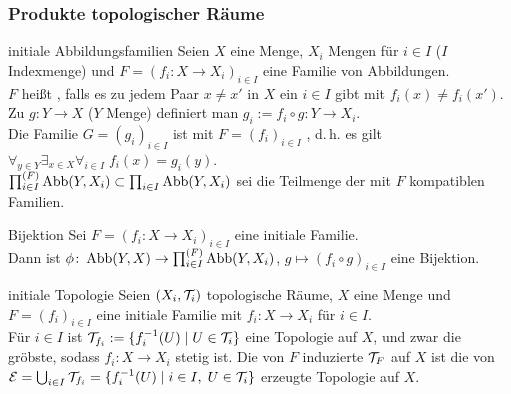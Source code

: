 \subsubsection{%
    Produkte topologischer Räume%
}

\begin{Def}{initiale Abbildungsfamilien}
    Seien $X$ eine Menge, $X_i$ Mengen für $i \in I$ ($I$ Indexmenge)
    und $F = (f_i\colon X \rightarrow X_i)_{i \in I}$ eine Familie von
    Abbildungen. \\
    $F$ heißt , falls es
    zu jedem Paar $x \not= x'$ in $X$ ein $i \in I$ gibt mit
    $f_i(x) \not= f_i(x')$. \\
    Zu $g\colon Y \rightarrow X$ ($Y$ Menge) definiert man
    $g_i := f_i \circ g\colon Y \rightarrow X_i$. \\
    Die Familie $G = (g_i)_{i \in I}$ ist mit $F = (f_i)_{i \in I}$
    , d.\,h. es gilt
    $\forall_{y \in Y} \exists_{x \in X} \forall_{i \in I}\;
    f_i(x) = g_i(y)$. \\
    $\prod_{i \in I}^{(F)} \operatorname{Abb}(Y, X_i) \subset \prod_{i \in I} \operatorname{Abb}(Y, X_i)$
    sei die Teilmenge der mit $F$ kompatiblen Familien.
\end{Def}

\begin{Satz}{Bijektion}
    Sei $F = (f_i\colon X \rightarrow X_i)_{i \in I}$ eine initiale Familie. \\
    Dann ist
    $\phi\colon \operatorname{Abb}(Y, X) \rightarrow \prod_{i \in I}^{(F)} \operatorname{Abb}(Y, X_i)$,
    $g \mapsto (f_i \circ g)_{i \in I}$ eine Bijektion.
\end{Satz}

\linie

\begin{Def}{initiale Topologie}
    Seien $(X_i, \mathcal{T}_i)$ topologische Räume, $X$ eine Menge und
    $F = (f_i)_{i \in I}$ eine initiale Familie mit
    $f_i\colon X \rightarrow X_i$ für $i \in I$. \\
    Für $i \in I$ ist $\mathcal{T}_{f_i} := \{f_i^{-1}(U) \;|\; U \in \mathcal{T}_i\}$ eine
    Topologie auf $X$, und zwar die gröbste, sodass
    $f_i\colon X \rightarrow X_i$ stetig ist.
    Die von $F$ induzierte  $\mathcal{T}_F$ auf $X$ ist
    die von \\
    $\mathcal{E} = \bigcup_{i \in I} \mathcal{T}_{f_i} =
    \{f_i^{-1}(U) \;|\; i \in I,\; U \in \mathcal{T}_i\}$ erzeugte Topologie auf $X$.
\end{Def}

